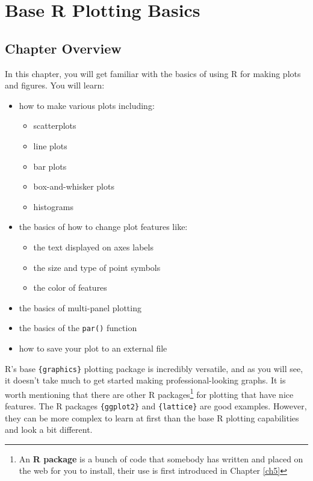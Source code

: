 \documentclass[]{book}
\providecommand{\tightlist}{%
  \setlength{\itemsep}{0pt}\setlength{\parskip}{0pt}}
\let\rmarkdownfootnote\footnote%
\def\footnote{\protect\rmarkdownfootnote}
\begin{document}
\hypertarget{ch2}{%
\chapter{Base R Plotting Basics}\label{ch2}}

\hypertarget{chapter-overview-1}{%
\section*{Chapter Overview}\label{chapter-overview-1}}

In this chapter, you will get familiar with the basics of using R for making plots and figures. You will learn:

\begin{itemize}
\tightlist
\item
  how to make various plots including:

  \begin{itemize}
  \tightlist
  \item
    scatterplots
  \item
    line plots
  \item
    bar plots
  \item
    box-and-whisker plots
  \item
    histograms
  \end{itemize}
\item
  the basics of how to change plot features like:

  \begin{itemize}
  \tightlist
  \item
    the text displayed on axes labels
  \item
    the size and type of point symbols
  \item
    the color of features
  \end{itemize}
\item
  the basics of multi-panel plotting
\item
  the basics of the \texttt{par()} function
\item
  how to save your plot to an external file
\end{itemize}

R's base \texttt{\{graphics\}} plotting package is incredibly versatile, and as you will see, it doesn't take much to get started making professional-looking graphs. It is worth mentioning that there are other R packages\footnote{An \textbf{R package} is a bunch of code that somebody has written and placed on the web for you to install, their use is first introduced in Chapter \ref{ch5}} for plotting that have nice features. The R packages \texttt{\{ggplot2\}} \citep{R-ggplot2} and \texttt{\{lattice\}} \citep{R-lattice} are good examples. However, they can be more complex to learn at first than the base R plotting capabilities and look a bit different.
\end{document}

